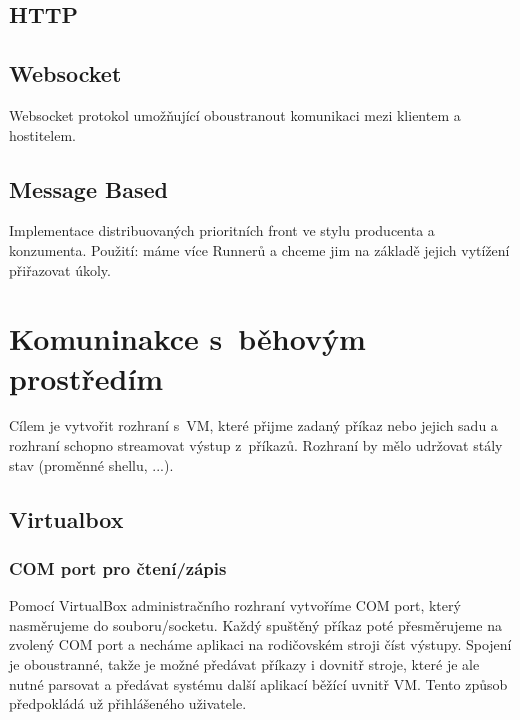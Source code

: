 
\subsection{HTTP}


\subsection{Websocket}

Websocket protokol umožňující oboustranout komunikaci mezi klientem a hostitelem.







\subsection{Message Based}

Implementace distribuovaných prioritních front ve stylu producenta a konzumenta.
Použití: máme více Runnerů a chceme jim na základě jejich vytížení přiřazovat úkoly.


\section{Komuninakce s~běhovým prostředím}

Cílem je vytvořit rozhraní s~VM, které přijme zadaný příkaz nebo jejich sadu a rozhraní schopno streamovat výstup z~příkazů.
Rozhraní by mělo udržovat stály stav (proměnné shellu, ...).

\subsection{Virtualbox}

\subsubsection{COM port pro čtení/zápis}

Pomocí VirtualBox administračního rozhraní vytvoříme COM port, který nasměrujeme do souboru/socketu.
Každý spuštěný příkaz poté přesměrujeme na zvolený COM port a necháme aplikaci na rodičovském stroji číst výstupy.
Spojení je oboustranné, takže je možné předávat příkazy i dovnitř stroje, které je ale nutné parsovat a předávat systému další aplikací běžící uvnitř VM.
Tento způsob předpokládá už přihlášeného uživatele.

